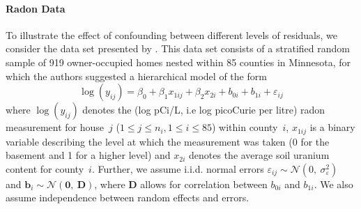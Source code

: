 \documentclass{article} %
\begin{document}
\paragraph{Radon Data}\label{sec:ex}
To illustrate the effect of confounding between different levels of residuals, we consider the data set presented by
 \cite{Gelman:2006ue}. This data set consists of a stratified random sample of 919 owner-occupied homes nested within 85 counties in Minnesota, for which the authors suggested a hierarchical model of the form
%
\begin{equation}\label{eq:radon}
  \log(y_{ij}) = \beta_0 + \beta_1 x_{1ij} + \beta_2 x_{2i} + b_{0i} + b_{1i} + \varepsilon_{ij}
\end{equation}
%
where   $\log(y_{ij})$ denotes the (log pCi/L, i.e log picoCurie per litre) radon measurement for house~$j$ ($1 \le j \le n_i, 1 \le i \le 85$) within county~$i$,
 $x_{1ij}$ is a binary variable describing the level at which the measurement was taken (0 for the basement and 1 for a higher level) and $x_{2i}$ denotes the average soil uranium content for  county~$i$. 
 Further, we assume i.i.d. normal errors $\varepsilon_{ij} \sim \mathcal{N} (0,\ \sigma^2_{\varepsilon})$  and $\bm{b}_i \sim \mathcal{N}(\bm{0},\ \bm{D})$, where $\bm{D}$ allows for correlation between $b_{0i}$ and $b_{1i}$.
We also assume independence between random effects and errors. 
\end{document}
